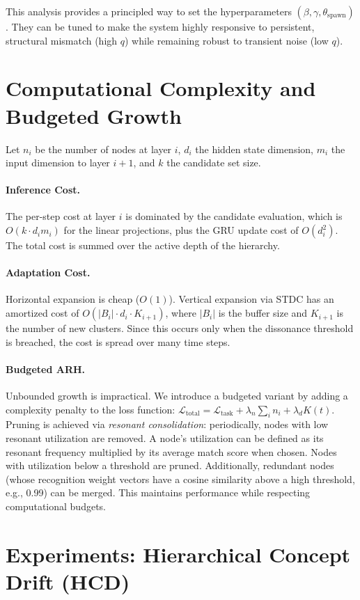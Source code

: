 \documentclass{article}
\begin{document}
This analysis provides a principled way to set the hyperparameters $(\beta, \gamma, \theta_{\text{spawn}})$. They can be tuned to make the system highly responsive to persistent, structural mismatch (high $q$) while remaining robust to transient noise (low $q$).

\section{Computational Complexity and Budgeted Growth}
Let $n_i$ be the number of nodes at layer $i$, $d_i$ the hidden state dimension, $m_i$ the input dimension to layer $i+1$, and $k$ the candidate set size.
\paragraph{Inference Cost.} The per-step cost at layer $i$ is dominated by the candidate evaluation, which is $O(k \cdot d_i m_i)$ for the linear projections, plus the GRU update cost of $O(d_i^2)$. The total cost is summed over the active depth of the hierarchy.
\paragraph{Adaptation Cost.} Horizontal expansion is cheap ($O(1)$). Vertical expansion via STDC has an amortized cost of $O(|B_i| \cdot d_i \cdot K_{i+1})$, where $|B_i|$ is the buffer size and $K_{i+1}$ is the number of new clusters. Since this occurs only when the dissonance threshold is breached, the cost is spread over many time steps.

\paragraph{Budgeted ARH.} Unbounded growth is impractical. We introduce a budgeted variant by adding a complexity penalty to the loss function: $\mathcal{L}_{\text{total}} = \mathcal{L}_{\text{task}} + \lambda_n \sum_i n_i + \lambda_d K(t)$. Pruning is achieved via \emph{resonant consolidation}: periodically, nodes with low resonant utilization are removed. A node's utilization can be defined as its resonant frequency multiplied by its average match score when chosen. Nodes with utilization below a threshold are pruned. Additionally, redundant nodes (whose recognition weight vectors have a cosine similarity above a high threshold, e.g., 0.99) can be merged. This maintains performance while respecting computational budgets.

\section{Experiments: Hierarchical Concept Drift (HCD)}
\end{document}
